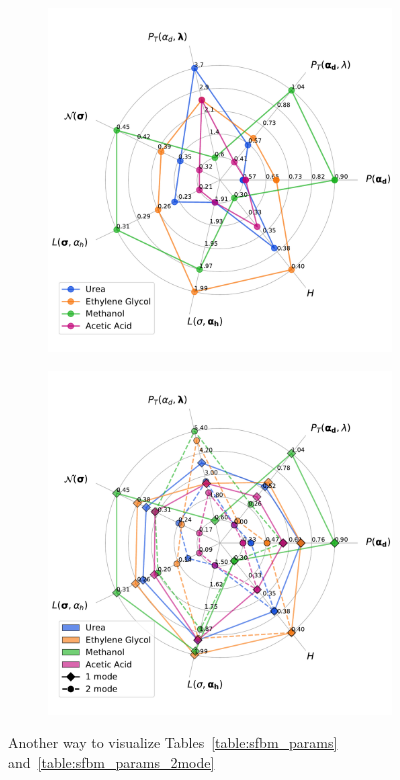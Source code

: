 \documentclass{article}
\begin{document}
  \begin{figure}
  \centering
  \begin{subfigure}{0.45\textwidth}
  \includegraphics[width=\linewidth]{1mode_radar.pdf}
  \caption{}\label{fig:1mode_radar}
  \end{subfigure}
  \begin{subfigure}{0.45\textwidth}
  \includegraphics[width=\linewidth]{2mode_radar.pdf}
  \caption{}\label{fig:2mode_radar}
  \end{subfigure}
  \caption{Another way to visualize Tables~\ref{table:sfbm_params} and~\ref{table:sfbm_params_2mode}}\label{fig:radars}
  \end{figure}
  
\end{document}
